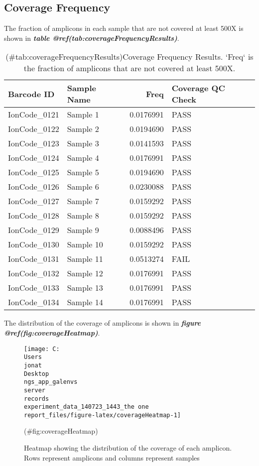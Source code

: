 \documentclass[
]{article}
\begin{document}
\hypertarget{coverage-frequency}{%
\subsection{Coverage Frequency}\label{coverage-frequency}}

The fraction of amplicons in each sample that are not covered at least 500X is shown in \textbf{\emph{table @ref(tab:coverageFrequencyResults)}}.

\begin{longtable}[t]{llrl}
\caption{(\#tab:coverageFrequencyResults)Coverage Frequency Results. `Freq` is the fraction of amplicons that are not covered at least 500X.}\\
\toprule
Barcode ID & Sample Name & Freq & Coverage QC Check\\
\midrule
IonCode\_0121 & Sample 1 & 0.0176991 & PASS\\
IonCode\_0122 & Sample 2 & 0.0194690 & PASS\\
IonCode\_0123 & Sample 3 & 0.0141593 & PASS\\
IonCode\_0124 & Sample 4 & 0.0176991 & PASS\\
IonCode\_0125 & Sample 5 & 0.0194690 & PASS\\
\addlinespace
IonCode\_0126 & Sample 6 & 0.0230088 & PASS\\
IonCode\_0127 & Sample 7 & 0.0159292 & PASS\\
IonCode\_0128 & Sample 8 & 0.0159292 & PASS\\
IonCode\_0129 & Sample 9 & 0.0088496 & PASS\\
IonCode\_0130 & Sample 10 & 0.0159292 & PASS\\
\addlinespace
IonCode\_0131 & Sample 11 & 0.0513274 & FAIL\\
IonCode\_0132 & Sample 12 & 0.0176991 & PASS\\
IonCode\_0133 & Sample 13 & 0.0176991 & PASS\\
IonCode\_0134 & Sample 14 & 0.0176991 & PASS\\
\bottomrule
\end{longtable}

The distribution of the coverage of amplicons is shown in \textbf{\emph{figure @ref(fig:coverageHeatmap)}}.

\begin{figure}
\texttt{[image: C:\\Users\\jonat\\Desktop\\ngs\_app\_galenvs\\server\\records\\experiment\_data\_140723\_1443\_the one\\report\_files/figure-latex/coverageHeatmap-1]} \caption[Coverage Heatmap]{Heatmap showing the distribution of the coverage of each amplicon. Rows represent amplicons and columns represent samples}(\#fig:coverageHeatmap)
\end{figure}
\end{document}
